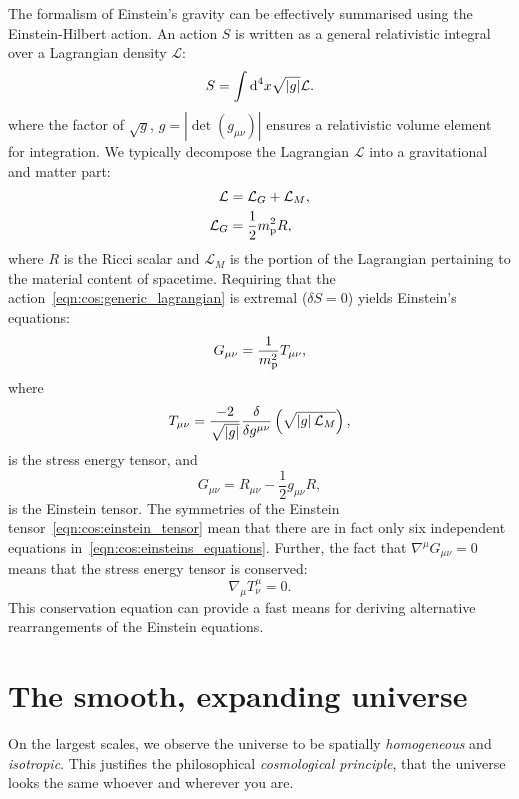 The formalism of Einstein's gravity can be effectively summarised using the Einstein-Hilbert action. An action $S$ is written as a general relativistic integral over a Lagrangian density $\mathcal{L}$:
\begin{equation}
  S = \int\d[4]{x} \sqrt{|g|} \mathcal{L}.
  \label{eqn:cos:generic_lagrangian}
\end{equation}
where the factor of $\sqrt{g}$, $g=\left|\det\left( g_{\mu\nu} \right)\right|$ ensures a relativistic volume element for integration.
We typically decompose the Lagrangian $\mathcal{L}$ into a gravitational and matter part:
\begin{align}
  \mathcal{L} &= \mathcal{L}_G + \mathcal{L}_M,
  \label{eqn:cos:decomp}\\
  \mathcal{L}_G &= \frac{1}{2} \m^2 R,
  \label{eqn:cos:L_grav}
\end{align}
where $R$ is the Ricci scalar and $\mathcal{L}_M$ is the portion of the Lagrangian pertaining to the material content of spacetime. Requiring that the action~\eqref{eqn:cos:generic_lagrangian} is extremal ($\delta S = 0$) yields Einstein's equations:
\begin{equation}
  G_{\mu\nu} = \frac{1}{\m^2}T_{\mu\nu},
  \label{eqn:cos:einsteins_equations}
\end{equation}
where
\begin{equation}
  T_{\mu\nu} = \frac{-2}{\sqrt{\abs{g}}}\frac{\delta}{\delta g^{\mu\nu}}\left( \sqrt{\abs{g} \mathcal{L}_M} \right),
  \label{eqn:cos:SET_fundamantal}
\end{equation}
is the stress energy tensor, and
\begin{equation}
  G_{\mu\nu} = R_{\mu\nu} - \frac{1}{2}g_{\mu\nu} R,
  \label{eqn:cos:einstein_tensor}
\end{equation}
is the Einstein tensor. The symmetries of the Einstein tensor~\eqref{eqn:cos:einstein_tensor} mean that there are in fact only six independent equations in~\eqref{eqn:cos:einsteins_equations}. Further, the fact that $\nabla^\mu G_{\mu\nu}=0$ means that the stress energy tensor is conserved:
\begin{equation}
  \nabla_\mu T^{\mu}_{\nu} = 0.
  \label{eqn:cos:SET_conservation}
\end{equation}
This conservation equation can provide a fast means for deriving alternative rearrangements of the Einstein equations.

\section{The smooth, expanding universe}
On the largest scales, we observe the universe to be spatially {\em homogeneous\/} and {\em isotropic}. This justifies the philosophical {\em cosmological principle}, that the universe looks the same whoever and wherever you are. 

